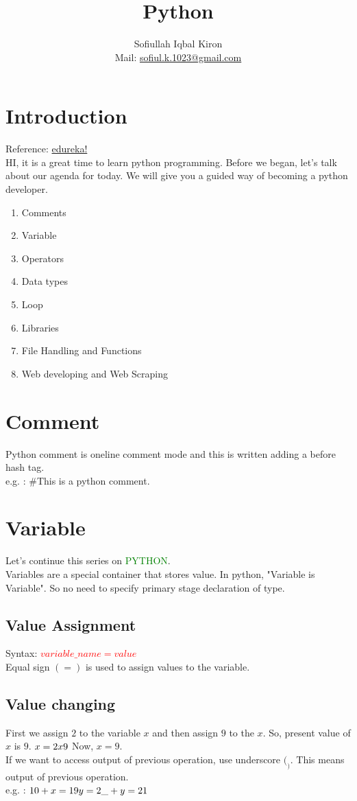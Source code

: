 \documentclass[11 pt, letterpaper]{article}
\title{Python}
\author
{
 Sofiullah Iqbal Kiron\\
 Mail: \href{mailto:sofiul.k.1023@gmail.com}{sofiul.k.1023@gmail.com}
}
\affil{BSMRSTU, Department of CSE}
\begin{document}
\maketitle
\tableofcontents

\section{Introduction}
Reference: \href{https://www.youtube.com/watch?v=WGJJIrtnfpk&t=12362s}{edureka!}\\
HI, it is a great time to learn python programming. Before we began, let's talk about our agenda for today. We will give you a guided way of becoming a python developer.\\
\begin{enumerate}
 \item Comments
 \item Variable
 \item Operators
 \item Data types
 \item Loop
 \item Libraries
 \item File Handling and Functions
 \item Web developing and Web Scraping
\end{enumerate}

\section{Comment}
Python comment is oneline comment mode and this is written adding a before hash tag.\\
e.g. : \#This is a python comment.

\section{Variable}
Let's continue this series on \textcolor{green}{PYTHON}.\\
Variables are a special container that stores value. In python, "Variable is Variable". So no need to specify primary stage declaration of type.
\subsection{Value Assignment}
Syntax: \textcolor{red}{$variable\_name = value$}\\
Equal sign $( = )$ is used to assign values to the variable.
\subsection{Value changing}
First we assign $2$ to the variable $x$ and then assign $9$ to the $x$. So, present value of $x$ is $9$.
$
x = 2\\
x  9\\
$
Now, $x=9$.
\\
If we want to access output of previous operation, use underscore $( _ )$. This means output of previous operation.
\\e.g. : $10 + x\\
= 19\\
y = 2\\
\_+ y\\
= 21\\
$
\end{document}
